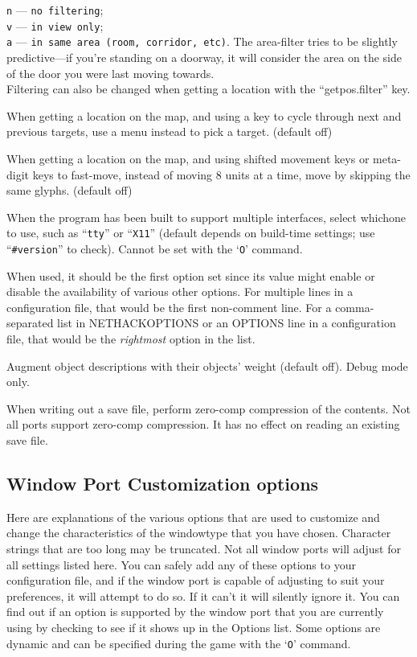 \documentclass[titlepage]{article}
\begin{document}
\begin{description}[font=\mdseries\itshape]
\texttt{n} --- \texttt{no filtering};\\
\texttt{v} --- \texttt{in view only};\\
\texttt{a} --- \texttt{in same area (room, corridor, etc)}.
The area-filter tries to be slightly
predictive---if
you're standing on a doorway, it will consider the area on the side of
the door you were last moving towards.\\
Filtering can also be changed when getting a location with
the ``getpos.filter'' key.
\item[whatis\textunderscore menu]
When getting a location on the map, and using a key to cycle through
next and previous targets, use a menu instead to pick a target.
(default off)
\item[whatis\textunderscore moveskip]
When getting a location on the map, and using shifted movement keys or
meta-digit keys to fast-move, instead of moving 8 units at a time,
move by skipping the same glyphs.
(default off)
\item[windowtype]
When the program has been built to support multiple interfaces,
select whichone to use, such as ``\texttt{tty}'' or ``\texttt{X11}''
(default depends on build-time settings; use ``\texttt{\#version}'' to check).
Cannot be set with the `\texttt{O}' command.

When used, it should be the first option set since its value might
enable or disable the availability of various other options.
For multiple lines in a configuration file, that would be the first
non-comment line.
For a comma-separated list in NETHACKOPTIONS or an OPTIONS line in a
configuration file, that would be the \textit{rightmost} option in the list.
\item[wizweight]
Augment object descriptions with their objects' weight (default off).
Debug mode only.
\item[zerocomp]
When writing out a save file, perform zero-comp compression of the
contents. Not all ports support zero-comp compression. It has no effect
on reading an existing save file.
\end{description}

\subsection*{Window Port Customization options}

Here are explanations of the various options that are
used to customize and change the characteristics of the
windowtype that you have chosen.
Character strings that are too long may be truncated.
Not all window ports will adjust for all settings listed
here.  You can safely add any of these options to your
configuration file, and if the window port is capable of adjusting
to suit your preferences, it will attempt to do so. If it
can't it will silently ignore it.  You can find out if an
option is supported by the window port that you are currently
using by checking to see if it shows up in the Options list.
Some options are dynamic and can be specified during the game
with the `\texttt{O}' command.
\end{document}
